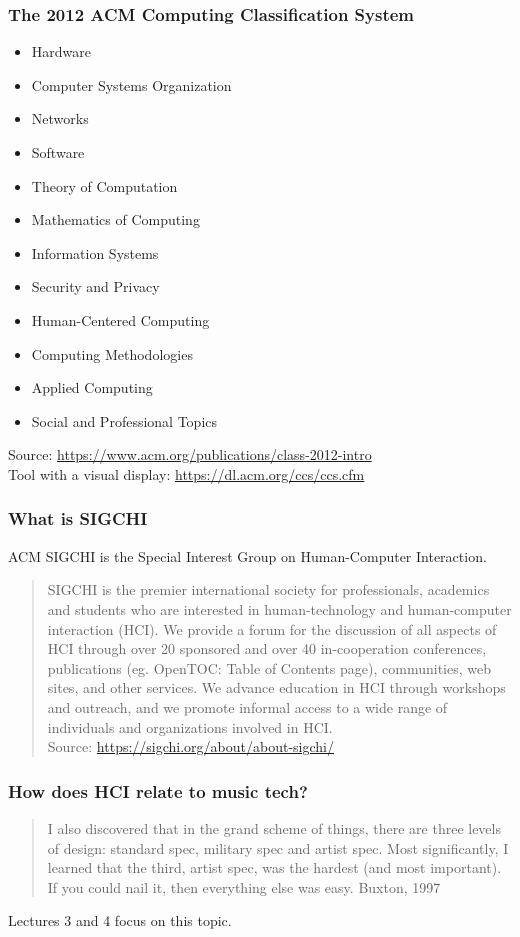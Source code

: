 \documentclass[screen, aspectratio=169]{beamer}
\begin{document}
\begin{frame}
\frametitle{The 2012 ACM Computing Classification System}
\begin{itemize}
\item Hardware
\item Computer Systems Organization
\item Networks
\item Software
\item Theory of Computation
\item Mathematics of Computing
\item Information Systems
\item Security and Privacy
\item Human-Centered Computing
\item Computing Methodologies
\item Applied Computing
\item Social and Professional Topics
\end{itemize}
Source: \url{https://www.acm.org/publications/class-2012-intro}\\
Tool with a visual display: \url{https://dl.acm.org/ccs/ccs.cfm}
\end{frame}
%
\begin{frame}
\frametitle{What is SIGCHI}
ACM SIGCHI is the Special Interest Group  on Human-Computer Interaction.
\begin{quote}
SIGCHI is the premier international society for professionals, academics and students who are interested in human-technology and human-computer interaction (HCI). We provide a forum for the discussion of all aspects of HCI through over 20 sponsored and over 40 in-cooperation conferences, publications (eg. OpenTOC: Table of Contents page), communities, web sites, and other services. We advance education in HCI through workshops and outreach, and we promote informal access to a wide range of individuals and organizations involved in HCI.\\ 
Source: \url{https://sigchi.org/about/about-sigchi/}
\end{quote}
\end{frame}
%
\begin{frame}
\frametitle{How does HCI relate to music tech?}
\begin{quote}
I also discovered that in the grand scheme of things, there are three
levels of design: standard spec, military spec and artist spec. Most significantly,
I learned that the third, artist spec, was the hardest (and most
important). If you could nail it, then everything else was easy. Buxton, 1997 ~\cite{Buxton.1997}
\end{quote}
Lectures 3 and 4 focus on this topic.
\end{frame}
\end{document}
